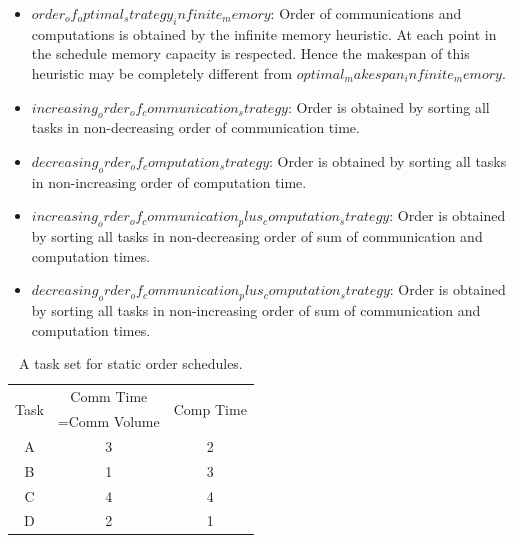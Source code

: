 \documentclass[runningheads]{llncs} %
\begin{document}
\begin{itemize}[a)]
	\item $order_of_optimal_strategy_infinite_memory $: Order of communications and computations is obtained by the infinite memory heuristic. At each point in the schedule memory capacity is respected. Hence the makespan of this heuristic may be completely different from $optimal_makespan_infinite_memory$.
	
	\item $increasing_order_of_communication_strategy$: Order is obtained by sorting all tasks in non-decreasing order of communication time. 
	
	\item $decreasing_order_of_computation_strategy$: Order is obtained by sorting all tasks in non-increasing order of computation time. 
	\item $increasing_order_of_communication_plus_computation_strategy$: Order is obtained by sorting all tasks in non-decreasing order of sum of communication and computation times.
	\item $decreasing_order_of_communication_plus_computation_strategy$: Order is obtained by sorting all tasks in non-increasing order of sum of communication and computation times.
	
\end{itemize}
	\begin{table}[htb]
	\begin{center}
	
		\begin{tabular}{|c|c|c|}
		\hline
		\multirow{2}{*}{Task} & Comm Time & \multirow{2}{*}{Comp Time}\\ 
		&=Comm Volume& \\ \hline
		A & 3 & 2\\ \hline
		B & 1 & 3\\ \hline
		C & 4 & 4\\ \hline
		D & 2 & 1\\ \hline
		\end{tabular}
	\caption{\label{tab:staticOrderExample} A task set for static order schedules.}
	\end{center}
	\end{table}
\end{document}
